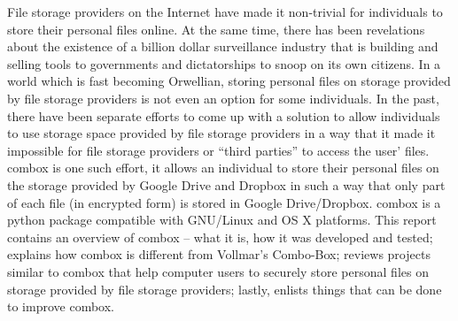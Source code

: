 \begin{abstractpage}\label{combox-abstract}
  File storage providers on the Internet have made it non-trivial for
  individuals to store their personal files online. At the same time,
  there has been revelations about the existence of a billion dollar
  surveillance industry\cite{website:wikileaks-spyfiles} that is
  building and selling tools to governments and dictatorships to snoop
  on its own citizens. In a world which is fast becoming Orwellian,
  storing personal files on storage provided by file storage providers
  is not even an option for some individuals. In the past, there have
  been separate efforts to come up with a solution to allow
  individuals to use storage space provided by file storage providers
  in a way that it made it impossible for file storage providers or
  ``third parties'' to access the user' files. combox is one such
  effort, it allows an individual to store their personal files on the
  storage provided by Google Drive and Dropbox in such a way that only
  part of each file (in encrypted form) is stored in Google
  Drive/Dropbox. combox is a python package compatible with GNU/Linux
  and OS X platforms. This report contains an overview of combox --
  what it is, how it was developed and tested; explains how combox is
  different from Vollmar's Combo-Box\cite{vollmar-combo-box}; reviews
  projects similar to combox that help computer users to securely
  store personal files on storage provided by file storage providers;
  lastly, enlists things that can be done to improve combox.
\end{abstractpage}
